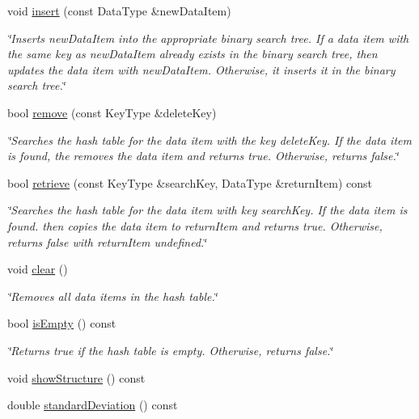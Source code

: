 \begin{DoxyCompactItemize}
void \hyperlink{class_hash_table_adc8f2be061729bdc5ecb171b54304e17}{insert} (const Data\+Type \&new\+Data\+Item)
\begin{DoxyCompactList}\small\item\em \char`\"{}\+Inserts new\+Data\+Item into the appropriate binary search tree. If a data item with the same key as new\+Data\+Item already exists in the binary search tree, then updates the data item with new\+Data\+Item. Otherwise, it inserts it in the binary search tree.\char`\"{} \end{DoxyCompactList}\item 
bool \hyperlink{class_hash_table_a46d3f8ad70fd80dc7aa64f50676ef7a5}{remove} (const Key\+Type \&delete\+Key)
\begin{DoxyCompactList}\small\item\em \char`\"{}\+Searches the hash table for the data item with the key delete\+Key. If the data item is found, the removes the data item and returns true. Otherwise, returns false.\char`\"{} \end{DoxyCompactList}\item 
bool \hyperlink{class_hash_table_ad4ee3ff641daa330260a48de29492e66}{retrieve} (const Key\+Type \&search\+Key, Data\+Type \&return\+Item) const 
\begin{DoxyCompactList}\small\item\em \char`\"{}\+Searches the hash table for the data item with key search\+Key. If the data item is found. then copies the data item to return\+Item and returns true. Otherwise, returns false with return\+Item undefined.\char`\"{} \end{DoxyCompactList}\item 
void \hyperlink{class_hash_table_a57f581334e35d45a8822c03edc0fcca6}{clear} ()
\begin{DoxyCompactList}\small\item\em \char`\"{}\+Removes all data items in the hash table.\char`\"{} \end{DoxyCompactList}\item 
bool \hyperlink{class_hash_table_a101e211a7fca37cd90722e15df2fc571}{is\+Empty} () const 
\begin{DoxyCompactList}\small\item\em \char`\"{}\+Returns true if the hash table is empty. Otherwise, returns false.\char`\"{} \end{DoxyCompactList}\item 
void \hyperlink{class_hash_table_a8b875e57f71a5bbba394e42361fb9fb4}{show\+Structure} () const 
\item 
double \hyperlink{class_hash_table_a4db2d920fd7c632f5b4b1bacd503bbf1}{standard\+Deviation} () const 
\end{DoxyCompactItemize}


